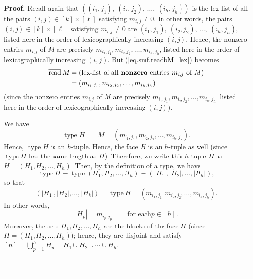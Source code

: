 \documentclass[12pt]{article}
\theoremstyle{definition}%
\theoremstyle{definition}%
\theoremstyle{remark}%
\newcommand{\interval}[1]{\left[ #1 \right]} %
\newcommand{\readb}{\mathop{\overline{\operatorname{read}}}}
\newcommand{\type}{\operatorname{type}}
\newenvironment{proof}[1][Proof]{\noindent\textbf{#1.} }{\ \rule{0.5em}{0.5em}}
\begin{document}
\begin{proof}
Recall again that $\left(  \left(  i_{1},j_{1}\right)  ,\ \left(  i_{2}
,j_{2}\right)  ,\ \ldots,\ \left(  i_{h},j_{h}\right)  \right)  $ is the
lex-list of all the pairs $\left(  i,j\right)  \in\interval{k}
\times\interval{\ell}$ satisfying $m_{i,j}\neq0$. In other words, the
pairs $\left(  i,j\right)  \in\interval{k}  \times\interval{\ell}$
satisfying $m_{i,j}\neq0$ are $\left(  i_{1},j_{1}\right)  ,\ \left(
i_{2},j_{2}\right)  ,\ \ldots,\ \left(  i_{h},j_{h}\right)  $, listed here in
the order of lexicographically increasing $\left(  i,j\right)  $. Hence, the
nonzero entries $m_{i,j}$ of $M$ are precisely $m_{i_{1},j_{1}},m_{i_{2}
,j_{2}},\ldots,m_{i_{h},j_{h}}$, listed here in the order of lexicographically
increasing $\left(  i,j\right)  $. But (\ref{eq.smf.readbM=lex}) becomes
\begin{align*}
\readb M &  =\left(  \text{lex-list of all
\textbf{nonzero} entries }m_{i,j}\text{ of }M\right)  \\
&  =\left(  m_{i_{1},j_{1}},m_{i_{2},j_{2}},\ldots,m_{i_{h},j_{h}}\right)
\end{align*}
(since the nonzero entries $m_{i,j}$ of $M$ are precisely $m_{i_{1},j_{1}
},m_{i_{2},j_{2}},\ldots,m_{i_{h},j_{h}}$, listed here in the order of
lexicographically increasing $\left(  i,j\right)  $).

We have
\begin{equation}
\type H=\readb M=\left(  m_{i_{1},j_{1}
},m_{i_{2},j_{2}},\ldots,m_{i_{h},j_{h}}\right)
.
\label{pf.lem.face-int-bij.sur.typeH}
\end{equation}
Hence, $\type H$ is an $h$-tuple. Hence, the face $H$ is an
$h$-tuple as well (since $\type H$ has the same length as $H$).
Therefore, we write this $h$-tuple $H$ as $H=\left(  H_{1},H_{2},\ldots
,H_{h}\right)  $. Then, by the definition of a type, we have
\[
\type H=\type \left(  H_{1},H_{2},\ldots
,H_{h}\right)  =\left(  \left\vert H_{1}\right\vert ,\left\vert H_{2}
\right\vert ,\ldots,\left\vert H_{h}\right\vert \right)  ,
\]
so that
\[
\left(  \left\vert H_{1}\right\vert ,\left\vert H_{2}\right\vert
,\ldots,\left\vert H_{h}\right\vert \right)  =\type H=\left(
m_{i_{1},j_{1}},m_{i_{2},j_{2}},\ldots,m_{i_{h},j_{h}}\right)  .
\]
In other words,
\begin{equation}
\left\vert H_{p}\right\vert =m_{i_{p},j_{p}}\ \ \ \ \ \ \ \ \ \ \text{for each
}p\in \interval{h} .
\label{pf.lem.face-int-bij.sur.sizeH}
\end{equation}
Moreover, the sets $H_{1},H_{2},\ldots,H_{h}$ are the blocks of the face $H$
(since $H=\left(  H_{1},H_{2},\ldots,H_{h}\right)  $); hence, they are
disjoint and satisfy $\interval{n}=\bigcup_{p=1}^{h}H_{p}=H_{1}\cup
H_{2}\cup\cdots\cup H_{h}$.


\end{proof}
\end{document}

